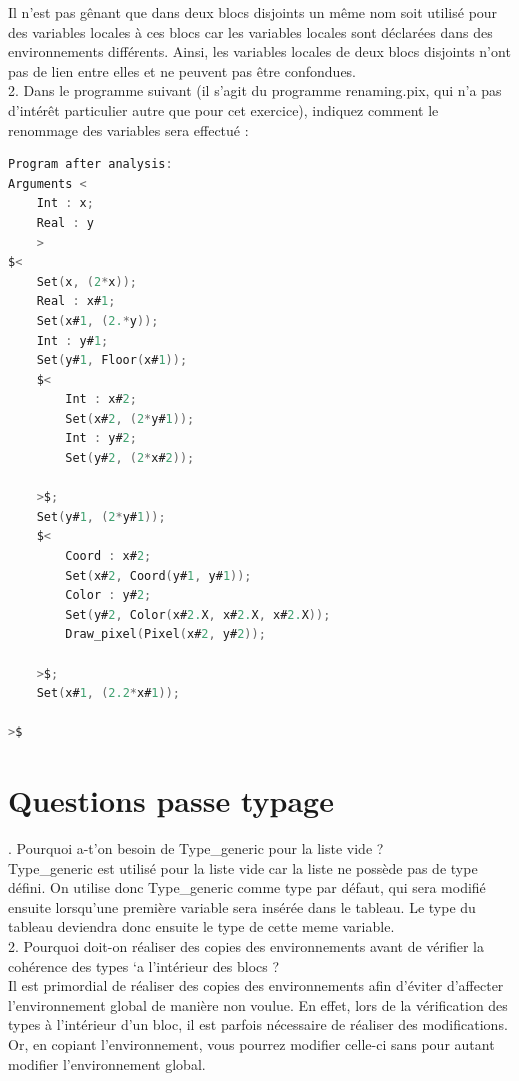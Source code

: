 \documentclass{report}
\begin{document}
    \quad Il n'est pas gênant que dans deux blocs disjoints un même nom soit utilisé pour des variables locales à ces blocs car les variables locales sont déclarées dans des environnements différents. Ainsi, les variables locales de deux blocs disjoints n'ont pas de lien entre elles et ne peuvent pas être confondues.\\

    2. Dans le programme suivant (il s'agit du programme renaming.pix, qui n'a pas d'intérêt particulier autre que pour cet exercice), indiquez comment le renommage des variables sera effectué :\\
    
    \begin{lstlisting}[language=C, basicstyle=\ttfamily]
Program after analysis:
Arguments <
    Int : x;
    Real : y
    >
$<
    Set(x, (2*x));
    Real : x#1;
    Set(x#1, (2.*y));
    Int : y#1;
    Set(y#1, Floor(x#1));
    $<
        Int : x#2;
        Set(x#2, (2*y#1));
        Int : y#2;
        Set(y#2, (2*x#2));
        
    >$;
    Set(y#1, (2*y#1));
    $<
        Coord : x#2;
        Set(x#2, Coord(y#1, y#1));
        Color : y#2;
        Set(y#2, Color(x#2.X, x#2.X, x#2.X));
        Draw_pixel(Pixel(x#2, y#2));
        
    >$;
    Set(x#1, (2.2*x#1));
    
>$
    \end{lstlisting}

    \newpage


    \section{Questions passe typage}

    . Pourquoi a-t'on besoin de Type\_generic pour la liste vide ?\\

    \quad Type\_generic est utilisé pour la liste vide car la liste ne possède pas de type défini. On utilise donc Type\_generic comme type par défaut, qui sera modifié ensuite lorsqu'une première variable sera insérée dans le tableau. Le type du tableau deviendra donc ensuite le type de cette meme variable.\\

    2. Pourquoi doit-on réaliser des copies des environnements avant de vérifier la cohérence
        des types `a l'intérieur des blocs ?\\

    \quad Il est primordial de réaliser des copies des environnements afin d'éviter d'affecter l'environnement global de manière non voulue. En effet, lors de la vérification des types à l'intérieur d'un bloc, il est parfois nécessaire de réaliser des modifications. Or, en copiant l'environnement, vous pourrez modifier celle-ci sans pour autant modifier l'environnement global. \\
\end{document}
